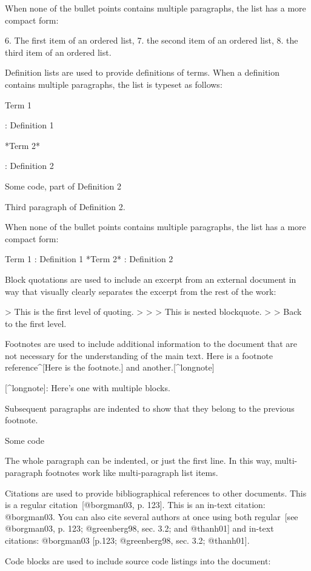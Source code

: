 \documentclass[
  digital,     %
  oneside,     %
  nosansbold,  %
  nocolorbold, %
  lof,         %
  lot,         %
]{fithesis4}
\begin{document}
\begin{markdown}
When none of the bullet points contains multiple paragraphs, the
list has a more compact form:

  6. The first item of an ordered list,
  7. the second item of an ordered list,
  8. the third item of an ordered list.

Definition lists are used to provide definitions of terms. When
a definition contains multiple paragraphs, the list is typeset
as follows:

Term 1

:   Definition 1

*Term 2*

:   Definition 2

        Some code, part of Definition 2

    Third paragraph of Definition 2.

When none of the bullet points contains multiple paragraphs, the
list has a more compact form:

Term 1
:   Definition 1
*Term 2*
:   Definition 2

Block quotations are used to include an excerpt from an external
document in way that visually clearly separates the excerpt from
the rest of the work:

> This is the first level of quoting.
>
> > This is nested blockquote.
>
> Back to the first level.

Footnotes are used to include additional information to the
document that are not necessary for the understanding of the main
text. Here is a footnote reference^[Here is the footnote.] and
another.[^longnote]

[^longnote]: Here's one with multiple blocks.

    Subsequent paragraphs are indented to show that they
belong to the previous footnote.

        Some code

    The whole paragraph can be indented, or just the first
    line.  In this way, multi-paragraph footnotes work like
    multi-paragraph list items.

Citations are used to provide bibliographical references to other
documents. This is a regular citation~[@borgman03, p. 123]. This is
an in-text citation: @borgman03. You can also cite several authors
at once using both regular~[see @borgman03, p. 123; @greenberg98,
sec.  3.2; and @thanh01] and in-text citations: @borgman03 [p.123;
@greenberg98, sec. 3.2; @thanh01].

Code blocks are used to include source code listings into the
document:


\end{markdown}
\end{document}
